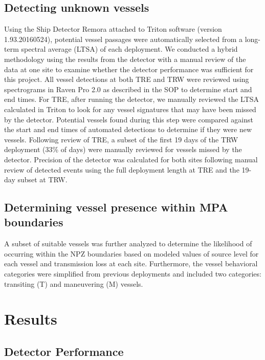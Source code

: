 \documentclass[
  letterpaper,
  oneside,
  open=any]{scrbook}
\begin{document}
\section{Detecting unknown vessels}\label{detecting-unknown-vessels}

Using the Ship Detector Remora attached to Triton software (version
1.93.20160524), potential vessel passages were automatically selected
from a long-term spectral average (LTSA) of each deployment. We
conducted a hybrid methodology using the results from the detector with
a manual review of the data at one site to examine whether the detector
performance was sufficient for this project. All vessel detections at
both TRE and TRW were reviewed using spectrograms in Raven Pro 2.0 as
described in the SOP to determine start and end times. For TRE, after
running the detector, we manually reviewed the LTSA calculated in Triton
to look for any vessel signatures that may have been missed by the
detector. Potential vessels found during this step were compared against
the start and end times of automated detections to determine if they
were new vessels. Following review of TRE, a subset of the first 19 days
of the TRW deployment (33\% of days) were manually reviewed for vessels
missed by the detector. Precision of the detector was calculated for
both sites following manual review of detected events using the full
deployment length at TRE and the 19-day subset at TRW.

\section{Determining vessel presence within MPA
boundaries}\label{determining-vessel-presence-within-mpa-boundaries}

A subset of suitable vessels was further analyzed to determine the
likelihood of occurring within the NPZ boundaries based on modeled
values of source level for each vessel and transmission loss at each
site. Furthermore, the vessel behavioral categories were simplified from
previous deployments and included two categories: transiting (T) and
maneuvering (M) vessels.


\chapter{Results}\label{results}

\section{Detector Performance}\label{detector-performance}
\end{document}
